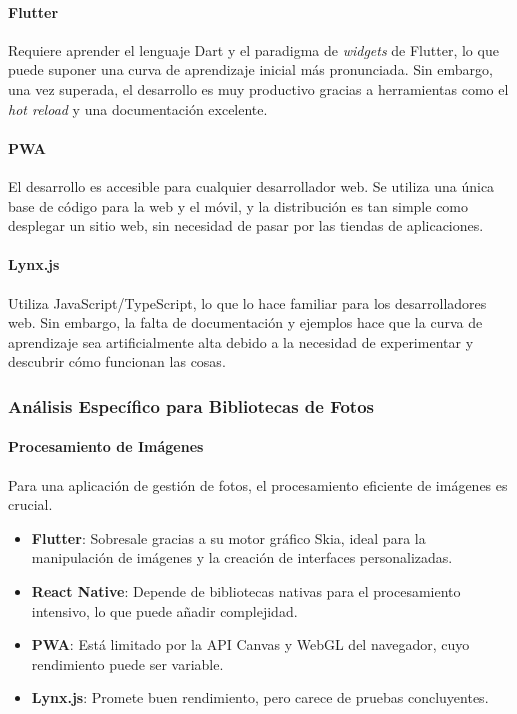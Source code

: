 \paragraph{Flutter}
Requiere aprender el lenguaje Dart y el paradigma de \textit{widgets} de Flutter, lo que puede suponer una curva de aprendizaje inicial más pronunciada. Sin embargo, una vez superada, el desarrollo es muy productivo gracias a herramientas como el \textit{hot reload} y una documentación excelente.

\paragraph{PWA}
El desarrollo es accesible para cualquier desarrollador web. Se utiliza una única base de código para la web y el móvil, y la distribución es tan simple como desplegar un sitio web, sin necesidad de pasar por las tiendas de aplicaciones.

\paragraph{Lynx.js}
Utiliza JavaScript/TypeScript, lo que lo hace familiar para los desarrolladores web. Sin embargo, la falta de documentación y ejemplos hace que la curva de aprendizaje sea artificialmente alta debido a la necesidad de experimentar y descubrir cómo funcionan las cosas.

\subsubsection{Análisis Específico para Bibliotecas de Fotos}

\paragraph{Procesamiento de Imágenes}
Para una aplicación de gestión de fotos, el procesamiento eficiente de imágenes es crucial.
\begin{itemize}
    \item \textbf{Flutter}: Sobresale gracias a su motor gráfico Skia, ideal para la manipulación de imágenes y la creación de interfaces personalizadas.
    \item \textbf{React Native}: Depende de bibliotecas nativas para el procesamiento intensivo, lo que puede añadir complejidad.
    \item \textbf{PWA}: Está limitado por la API Canvas y WebGL del navegador, cuyo rendimiento puede ser variable.
    \item \textbf{Lynx.js}: Promete buen rendimiento, pero carece de pruebas concluyentes.
\end{itemize}

